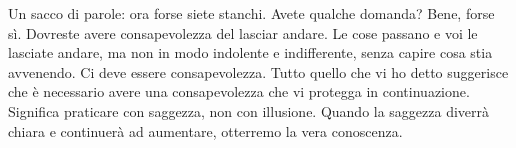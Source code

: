 Un sacco di parole: ora forse siete stanchi. Avete qualche domanda?
Bene, forse sì. Dovreste avere consapevolezza del lasciar andare. Le
cose passano e voi le lasciate andare, ma non in modo indolente e
indifferente, senza capire cosa stia avvenendo. Ci deve essere
consapevolezza. Tutto quello che vi ho detto suggerisce che è necessario
avere una consapevolezza che vi protegga in continuazione. Significa
praticare con saggezza, non con illusione. Quando la saggezza diverrà
chiara e continuerà ad aumentare, otterremo la vera conoscenza.

